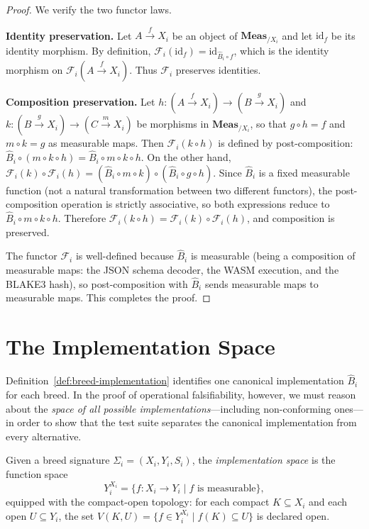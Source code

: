 \begin{proof}
We verify the two functor laws.

\medskip
\noindent\textbf{Identity preservation.}  Let $A \xrightarrow{f} X_i$ be an object
of $\mathbf{Meas}_{/X_i}$ and let $\mathrm{id}_f$ be its identity morphism.  By
definition, $\mathcal{F}_i(\mathrm{id}_f) = \mathrm{id}_{\hat{B}_i \circ f}$, which
is the identity morphism on $\mathcal{F}_i(A \xrightarrow{f} X_i)$.  Thus
$\mathcal{F}_i$ preserves identities.

\medskip
\noindent\textbf{Composition preservation.}  Let $h : (A \xrightarrow{f} X_i) \to
(B \xrightarrow{g} X_i)$ and $k : (B \xrightarrow{g} X_i) \to (C \xrightarrow{m}
X_i)$ be morphisms in $\mathbf{Meas}_{/X_i}$, so that $g \circ h = f$ and $m \circ
k = g$ as measurable maps.  Then $\mathcal{F}_i(k \circ h)$ is defined by
post-composition: $\hat{B}_i \circ (m \circ k \circ h) = \hat{B}_i \circ m \circ k
\circ h$.  On the other hand, $\mathcal{F}_i(k) \circ \mathcal{F}_i(h) =
(\hat{B}_i \circ m \circ k) \circ (\hat{B}_i \circ g \circ h)$.  Since $\hat{B}_i$
is a fixed measurable function (not a natural transformation between two different
functors), the post-composition operation is strictly associative, so both
expressions reduce to $\hat{B}_i \circ m \circ k \circ h$.  Therefore
$\mathcal{F}_i(k \circ h) = \mathcal{F}_i(k) \circ \mathcal{F}_i(h)$, and
composition is preserved.

\medskip
\noindent The functor $\mathcal{F}_i$ is well-defined because $\hat{B}_i$ is
measurable (being a composition of measurable maps: the JSON schema decoder,
the WASM execution, and the BLAKE3 hash), so post-composition with $\hat{B}_i$
sends measurable maps to measurable maps.  This completes the proof.
\end{proof}

\section{The Implementation Space}
\label{sec:implementation-space}

Definition~\ref{def:breed-implementation} identifies one canonical implementation
$\hat{B}_i$ for each breed.  In the proof of operational falsifiability, however,
we must reason about the \emph{space of all possible implementations}—including
non-conforming ones—in order to show that the test suite separates the canonical
implementation from every alternative.

\begin{definition}
\label{def:implementation-space}
Given a breed signature $\Sigma_i = (X_i, Y_i, S_i)$, the \emph{implementation
space} is the function space
\[
  Y_i^{X_i} = \{ f : X_i \to Y_i \mid f \text{ is measurable} \},
\]
equipped with the compact-open topology: for each compact $K \subseteq X_i$ and
each open $U \subseteq Y_i$, the set $V(K, U) = \{ f \in Y_i^{X_i} \mid f(K)
\subseteq U \}$ is declared open.
\end{definition}

